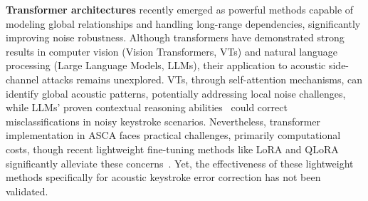 \textbf{Transformer architectures} recently emerged as powerful methods capable of modeling global relationships and handling long-range dependencies, significantly improving noise robustness. Although transformers have demonstrated strong results in computer vision (Vision Transformers, VTs) and natural language processing (Large Language Models, LLMs), their application to acoustic side-channel attacks remains unexplored. VTs, through self-attention mechanisms, can identify global acoustic patterns, potentially addressing local noise challenges, while LLMs' proven contextual reasoning abilities~\cite{dosovitskiy2020image, brown2020language} could correct misclassifications in noisy keystroke scenarios. Nevertheless, transformer implementation in ASCA faces practical challenges, primarily computational costs, though recent lightweight fine-tuning methods like LoRA and QLoRA significantly alleviate these concerns~\cite{hu2021lora, dettmers2024qlora}. Yet, the effectiveness of these lightweight methods specifically for acoustic keystroke error correction has not been validated.



